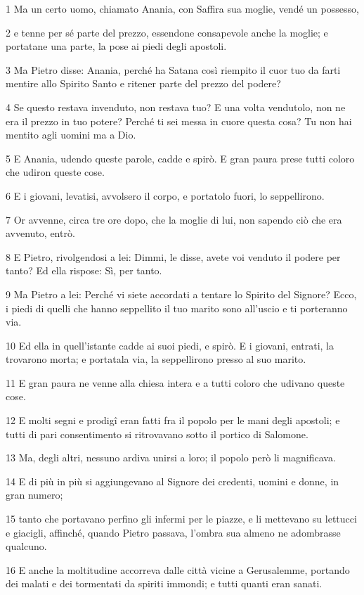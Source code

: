 \par 1 Ma un certo uomo, chiamato Anania, con Saffira sua moglie, vendé un possesso,
\par 2 e tenne per sé parte del prezzo, essendone consapevole anche la moglie; e portatane una parte, la pose ai piedi degli apostoli.
\par 3 Ma Pietro disse: Anania, perché ha Satana così riempito il cuor tuo da farti mentire allo Spirito Santo e ritener parte del prezzo del podere?
\par 4 Se questo restava invenduto, non restava tuo? E una volta vendutolo, non ne era il prezzo in tuo potere? Perché ti sei messa in cuore questa cosa? Tu non hai mentito agli uomini ma a Dio.
\par 5 E Anania, udendo queste parole, cadde e spirò. E gran paura prese tutti coloro che udiron queste cose.
\par 6 E i giovani, levatisi, avvolsero il corpo, e portatolo fuori, lo seppellirono.
\par 7 Or avvenne, circa tre ore dopo, che la moglie di lui, non sapendo ciò che era avvenuto, entrò.
\par 8 E Pietro, rivolgendosi a lei: Dimmi, le disse, avete voi venduto il podere per tanto? Ed ella rispose: Sì, per tanto.
\par 9 Ma Pietro a lei: Perché vi siete accordati a tentare lo Spirito del Signore? Ecco, i piedi di quelli che hanno seppellito il tuo marito sono all'uscio e ti porteranno via.
\par 10 Ed ella in quell'istante cadde ai suoi piedi, e spirò. E i giovani, entrati, la trovarono morta; e portatala via, la seppellirono presso al suo marito.
\par 11 E gran paura ne venne alla chiesa intera e a tutti coloro che udivano queste cose.
\par 12 E molti segni e prodigî eran fatti fra il popolo per le mani degli apostoli; e tutti di pari consentimento si ritrovavano sotto il portico di Salomone.
\par 13 Ma, degli altri, nessuno ardiva unirsi a loro; il popolo però li magnificava.
\par 14 E di più in più si aggiungevano al Signore dei credenti, uomini e donne, in gran numero;
\par 15 tanto che portavano perfino gli infermi per le piazze, e li mettevano su lettucci e giacigli, affinché, quando Pietro passava, l'ombra sua almeno ne adombrasse qualcuno.
\par 16 E anche la moltitudine accorreva dalle città vicine a Gerusalemme, portando dei malati e dei tormentati da spiriti immondi; e tutti quanti eran sanati.
